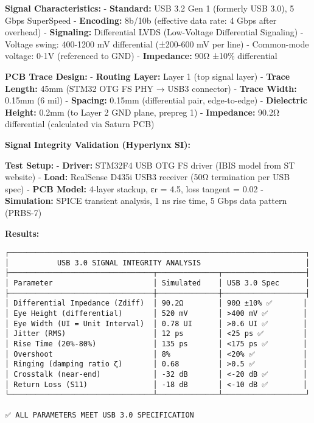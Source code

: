 \documentclass[
]{article}
\begin{document}
\textbf{Signal Characteristics:} - \textbf{Standard:} USB 3.2 Gen 1
(formerly USB 3.0), 5 Gbps SuperSpeed - \textbf{Encoding:} 8b/10b
(effective data rate: 4 Gbps after overhead) - \textbf{Signaling:}
Differential LVDS (Low-Voltage Differential Signaling) - Voltage swing:
400-1200 mV differential (±200-600 mV per line) - Common-mode voltage:
0-1V (referenced to GND) - \textbf{Impedance:} 90Ω ±10\% differential

\textbf{PCB Trace Design:} - \textbf{Routing Layer:} Layer 1 (top signal
layer) - \textbf{Trace Length:} 45mm (STM32 OTG FS PHY → USB3 connector)
- \textbf{Trace Width:} 0.15mm (6 mil) - \textbf{Spacing:} 0.15mm
(differential pair, edge-to-edge) - \textbf{Dielectric Height:} 0.2mm
(to Layer 2 GND plane, prepreg 1) - \textbf{Impedance:} 90.2Ω
differential (calculated via Saturn PCB)

\textbf{Signal Integrity Validation (Hyperlynx SI):}

\textbf{Test Setup:} - \textbf{Driver:} STM32F4 USB OTG FS driver (IBIS
model from ST website) - \textbf{Load:} RealSense D435i USB3 receiver
(50Ω termination per USB spec) - \textbf{PCB Model:} 4-layer stackup, εr
= 4.5, loss tangent = 0.02 - \textbf{Simulation:} SPICE transient
analysis, 1 ns rise time, 5 Gbps data pattern (PRBS-7)

\textbf{Results:}

\begin{verbatim}
┌────────────────────────────────────────────────────────────────────┐
│           USB 3.0 SIGNAL INTEGRITY ANALYSIS                        │
├─────────────────────────────────┬──────────────┬───────────────────┤
│ Parameter                       │ Simulated    │ USB 3.0 Spec      │
├─────────────────────────────────┼──────────────┼───────────────────┤
│ Differential Impedance (Zdiff)  │ 90.2Ω        │ 90Ω ±10% ✅       │
│ Eye Height (differential)       │ 520 mV       │ >400 mV ✅        │
│ Eye Width (UI = Unit Interval)  │ 0.78 UI      │ >0.6 UI ✅        │
│ Jitter (RMS)                    │ 12 ps        │ <25 ps ✅         │
│ Rise Time (20%-80%)             │ 135 ps       │ <175 ps ✅        │
│ Overshoot                       │ 8%           │ <20% ✅           │
│ Ringing (damping ratio ζ)       │ 0.68         │ >0.5 ✅           │
│ Crosstalk (near-end)            │ -32 dB       │ <-20 dB ✅        │
│ Return Loss (S11)               │ -18 dB       │ <-10 dB ✅        │
└─────────────────────────────────┴──────────────┴───────────────────┘

✅ ALL PARAMETERS MEET USB 3.0 SPECIFICATION
\end{verbatim}
\end{document}

